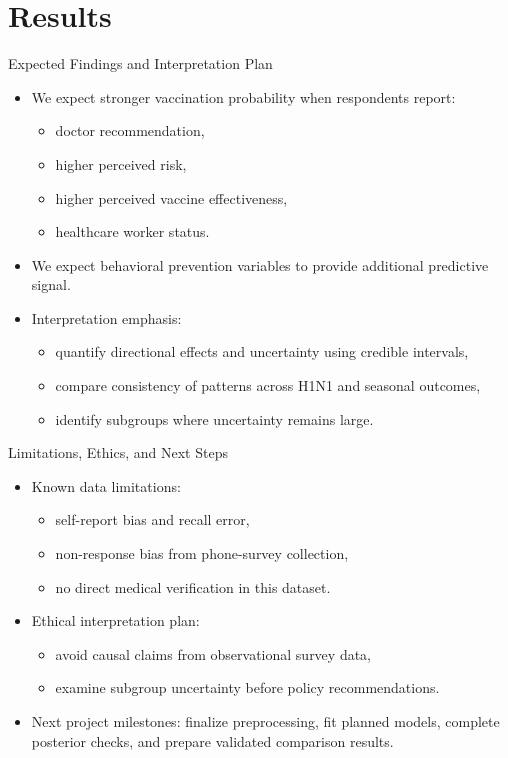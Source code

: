 \section{Results}

\begin{frame}{Expected Findings and Interpretation Plan}
	\begin{itemize}
		\item We expect stronger vaccination probability when respondents report:
		\begin{itemize}
			\item doctor recommendation,
			\item higher perceived risk,
			\item higher perceived vaccine effectiveness,
			\item healthcare worker status.
		\end{itemize}
		\item We expect behavioral prevention variables to provide additional predictive signal.
		\item Interpretation emphasis:
		\begin{itemize}
			\item quantify directional effects and uncertainty using credible intervals,
			\item compare consistency of patterns across H1N1 and seasonal outcomes,
			\item identify subgroups where uncertainty remains large.
		\end{itemize}
	\end{itemize}
\end{frame}

\begin{frame}{Limitations, Ethics, and Next Steps}
	\begin{itemize}
		\item Known data limitations:
		\begin{itemize}
			\item self-report bias and recall error,
			\item non-response bias from phone-survey collection,
			\item no direct medical verification in this dataset.
		\end{itemize}
		\item Ethical interpretation plan:
		\begin{itemize}
			\item avoid causal claims from observational survey data,
			\item examine subgroup uncertainty before policy recommendations.
		\end{itemize}
		\item Next project milestones: finalize preprocessing, fit planned models, complete posterior checks, and prepare validated comparison results.
	\end{itemize}
\end{frame}